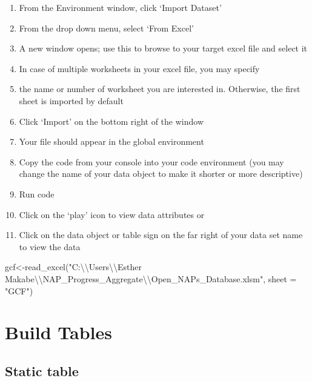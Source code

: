 \documentclass[
]{book}
\newenvironment{Shaded}{\begin{snugshade}}{\end{snugshade}}
\newcommand{\AttributeTok}[1]{\textcolor[rgb]{0.77,0.63,0.00}{#1}}
\newcommand{\FunctionTok}[1]{\textcolor[rgb]{0.00,0.00,0.00}{#1}}
\newcommand{\NormalTok}[1]{#1}
\newcommand{\OtherTok}[1]{\textcolor[rgb]{0.56,0.35,0.01}{#1}}
\newcommand{\SpecialCharTok}[1]{\textcolor[rgb]{0.00,0.00,0.00}{#1}}
\newcommand{\StringTok}[1]{\textcolor[rgb]{0.31,0.60,0.02}{#1}}
\providecommand{\tightlist}{%
  \setlength{\itemsep}{0pt}\setlength{\parskip}{0pt}}
\begin{document}
\begin{enumerate}
\def\labelenumi{\arabic{enumi}.}
\setcounter{enumi}{2}
\tightlist
\item
  From the Environment window, click `Import Dataset'
\item
  From the drop down menu, select `From Excel'
\item
  A new window opens; use this to browse to your target excel file and select it
\item
  In case of multiple worksheets in your excel file, you may specify
\item
  the name or number of worksheet you are interested in. Otherwise, the first sheet is imported by default
\item
  Click `Import' on the bottom right of the window
\item
  Your file should appear in the global environment
\item
  Copy the code from your console into your code environment (you may change the name of your data object to make it shorter or more descriptive)
\item
  Run code
\item
  Click on the `play' icon to view data attributes or
\item
  Click on the data object or table sign on the far right of your data set name to view the data
\end{enumerate}

\begin{Shaded}
\begin{Highlighting}[]
\NormalTok{gcf}\OtherTok{\textless{}{-}}\FunctionTok{read\_excel}\NormalTok{(}\StringTok{"C:}\SpecialCharTok{\textbackslash{}\textbackslash{}}\StringTok{Users}\SpecialCharTok{\textbackslash{}\textbackslash{}}\StringTok{Esther Makabe}\SpecialCharTok{\textbackslash{}\textbackslash{}}\StringTok{NAP\_Progress\_Aggregate}\SpecialCharTok{\textbackslash{}\textbackslash{}}\StringTok{Open\_NAPs\_Database.xlsm"}\NormalTok{, }\AttributeTok{sheet =} \StringTok{"GCF"}\NormalTok{)}
\end{Highlighting}
\end{Shaded}

\hypertarget{build-tables}{%
\section{Build Tables}\label{build-tables}}

\hypertarget{static-table}{%
\subsection{Static table}\label{static-table}}
\end{document}
